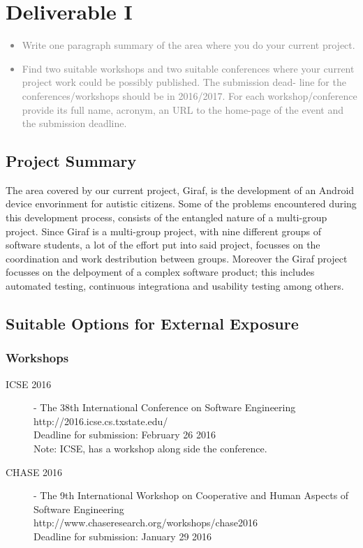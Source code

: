 \chapter{Deliverable I}
\textcolor{gray}{%
\begin{itemize}
    \item Write one paragraph summary of the area where you do your current project.
    \item Find two suitable workshops and two suitable conferences where your current project work could be possibly published. The submission dead- line for the conferences/workshops should be in 2016/2017. For each workshop/conference provide its full name, acronym, an URL to the home-page of the event and the submission deadline.
\end{itemize}}
\section{Project Summary} %
\label{sec:project_summary}
The area covered by our current project, Giraf, is the development of an Android device envorinment for autistic citizens. 
Some of the problems encountered during this development process, consists of the entangled nature of a multi-group project. 
Since Giraf is a multi-group project, with nine different groups of software students, a lot of the effort put into said project, focusses on the coordination and work destribution between groups. 
Moreover the Giraf project focusses on the delpoyment of a complex software product; this includes automated testing, continuous integrationa and usability testing among others.

\section{Suitable Options for External Exposure}
\subsection{Workshops}
\begin{description}
    \item[ICSE 2016] - The 38th International Conference on Software Engineering \\
    http://2016.icse.cs.txstate.edu/ \\
Deadline for submission: February 26 2016 \\
Note: ICSE, has a workshop along side the conference.
    \item[CHASE 2016] - The 9th International Workshop on Cooperative and Human Aspects of Software Engineering \\
http://www.chaseresearch.org/workshops/chase2016 \\
Deadline for submission: January 29 2016
\end{description}             
